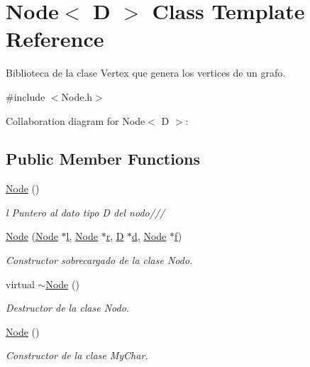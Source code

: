 \hypertarget{class_node}{\section{Node$<$ D $>$ Class Template Reference}
\label{class_node}
}


Biblioteca de la clase Vertex que genera los vertices de un grafo.  




{\ttfamily \#include $<$Node.\+h$>$}



Collaboration diagram for Node$<$ D $>$\+:
\subsection*{Public Member Functions}
\begin{DoxyCompactItemize}
\item 
\hyperlink{class_node_a6d883b970cbbadb1f7d4785f737fc650}{Node} ()
\begin{DoxyCompactList}\small\item\em l Puntero al dato tipo D del nodo/// \end{DoxyCompactList}\item 
\hyperlink{class_node_aa78739f6f3d6164fe37f7d838959d7cf}{Node} (\hyperlink{class_node}{Node} $\ast$\hyperlink{class_node_a0887ae573dd58274be628313b5170186}{l}, \hyperlink{class_node}{Node} $\ast$\hyperlink{class_node_a61cefac7cf9a73b5057968706f6931fe}{r}, \hyperlink{gwp_2main_8cpp_af316c33cc298530f245e8b55330e86b5}{D} $\ast$\hyperlink{class_node_ab9a8975b57edc70d79492408a950c666}{d}, \hyperlink{class_node}{Node} $\ast$\hyperlink{class_node_a33f853af2475252e43c437811478fae1}{f})
\begin{DoxyCompactList}\small\item\em Constructor sobrecargado de la clase Nodo. \end{DoxyCompactList}\item 
virtual \hyperlink{class_node_a6b5a080cf05afe6a81e4dd56ba5f90e3}{$\sim$\+Node} ()
\begin{DoxyCompactList}\small\item\em Destructor de la clase Nodo. \end{DoxyCompactList}\item 
\hyperlink{class_node_a6d883b970cbbadb1f7d4785f737fc650}{Node} ()
\begin{DoxyCompactList}\small\item\em Constructor de la clase My\+Char. \end{DoxyCompactList}\item 

\end{DoxyCompactItemize}
